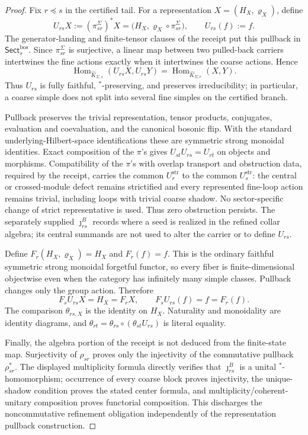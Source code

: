 \documentclass[11pt]{article}
\begin{document}
\begin{proof}
Fix \(r\preceq s\) in the certified tail. For a representation
\(X=(H_X,\varrho_X)\), define
\[
U_{rs}X
:=(\pi_{sr}^{\Sigma})^*X
=\bigl(H_X,\varrho_X\circ\pi_{sr}^{\Sigma}\bigr),
\qquad
U_{rs}(f):=f.
\]
The generator-landing and finite-tensor clauses of the receipt put this pullback in
\(\mathsf{Sect}^{\mathrm{bos}}_s\). Since \(\pi_{sr}^{\Sigma}\) is surjective, a linear map
between two pulled-back carriers intertwines the fine actions exactly when it intertwines the
coarse actions. Hence
\[
\operatorname{Hom}_{\widehat K_{\Sigma,s}}(U_{rs}X,U_{rs}Y)
=
\operatorname{Hom}_{\widehat K_{\Sigma,r}}(X,Y).
\]
Thus \(U_{rs}\) is fully faithful, \(^*\)-preserving, and preserves irreducibility; in particular,
a coarse simple does not split into several fine simples on the certified branch.

Pullback preserves the trivial representation, tensor products, conjugates, evaluation and
coevaluation, and the canonical bosonic flip. With the standard underlying-Hilbert-space
identifications these are symmetric strong monoidal identities. Exact composition of the
\(\pi\)'s gives \(U_{st}U_{rs}=U_{rt}\) on objects and morphisms. Compatibility of the \(\pi\)'s
with overlap transport and obstruction data, required by the receipt, carries the common
\(U^{\mathrm{str}}_r\) to the common \(U^{\mathrm{str}}_s\): the central or crossed-module defect
remains strictified and every represented fine-loop action remains trivial, including loops with
trivial coarse shadow. No sector-specific change of strict representative is used.
Thus zero obstruction persists. The separately supplied \(\jmath_{rs}^{B}\) records
where a seed is realized in the refined collar algebra; its central summands are not used to alter
the carrier or to define \(U_{rs}\).

Define \(F_r(H_X,\varrho_X)=H_X\) and \(F_r(f)=f\). This is the ordinary faithful symmetric
strong monoidal forgetful functor, so every fiber is finite-dimensional objectwise even when the
category has infinitely many simple classes. Pullback changes only the group action. Therefore
\[
F_sU_{rs}X=H_X=F_rX,
\qquad
F_sU_{rs}(f)=f=F_r(f).
\]
The comparison \(\theta_{rs,X}\) is the identity on \(H_X\). Naturality and monoidality are
identity diagrams, and
\(\theta_{rt}=\theta_{rs}\circ(\theta_{st}U_{rs})\) is literal equality.

Finally, the algebra portion of the receipt is not deduced from the finite-state map. Surjectivity
of \(\rho_{sr}\) proves only the injectivity of the commutative pullback \(\rho_{sr}^*\). The
displayed multiplicity formula directly verifies that \(\jmath_{rs}^{B}\) is a unital
\(^*\)-homomorphism; occurrence of every coarse block proves injectivity, the unique-shadow
condition proves the stated center formula, and multiplicity/coherent-unitary composition proves
functorial composition. This discharges the noncommutative refinement obligation independently of
the representation pullback construction.
\end{proof}
\end{document}
